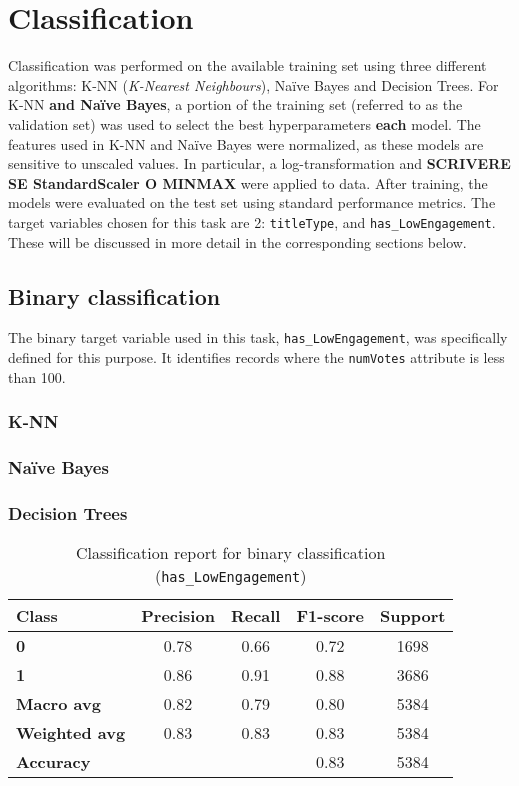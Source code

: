 
\chapter{Classification}
\label{ch:capitolo3}
Classification was performed on the available training set using three different algorithms: K-NN (\textit{K-Nearest Neighbours}), Naïve Bayes and Decision Trees.
For K-NN \textbf{and Naïve Bayes}, a portion of the training set (referred to as the validation set) was used to select the best hyperparameters \textbf{each} model.
The features used in K-NN and Naïve Bayes were normalized, as these models are sensitive to unscaled values.
In particular, a log-transformation and \textbf{SCRIVERE SE StandardScaler O MINMAX} were applied to data.
After training, the models were evaluated on the test set using standard performance metrics. 
The target variables chosen for this task are 2: \texttt{titleType}, and \texttt{has\_LowEngagement}.
These will be discussed in more detail in the corresponding sections below.

\section{Binary classification}\label{sec:binary_classification}
The binary target variable used in this task, \texttt{has\_LowEngagement}, was specifically defined for this purpose. 
It identifies records where the \texttt{numVotes} attribute is less than 100.
\subsection*{K-NN}
\subsection*{Naïve Bayes}
\subsection*{Decision Trees}
\begin{table}[h!]
    \centering
    \caption{Classification report for binary classification (\texttt{has\_LowEngagement})}
    \begin{tabular}{lcccc}
        \toprule
        \bf{Class} & \bf{Precision} & \bf{Recall} & \bf{F1-score} & \bf{Support} \\
        \midrule
        \bf{0} & 0.78 & 0.66 & 0.72 & 1698 \\
        \bf{1} & 0.86 & 0.91 & 0.88 & 3686 \\
        \midrule
        \bf{Macro avg} & 0.82 & 0.79 & 0.80 & 5384 \\
        \bf{Weighted avg} & 0.83 & 0.83 & 0.83 & 5384 \\
        \midrule
        \bf{Accuracy}  &  &  & 0.83 & 5384 \\
        \bottomrule
    \end{tabular}
    \label{tab:binary_classification_report}
\end{table}


